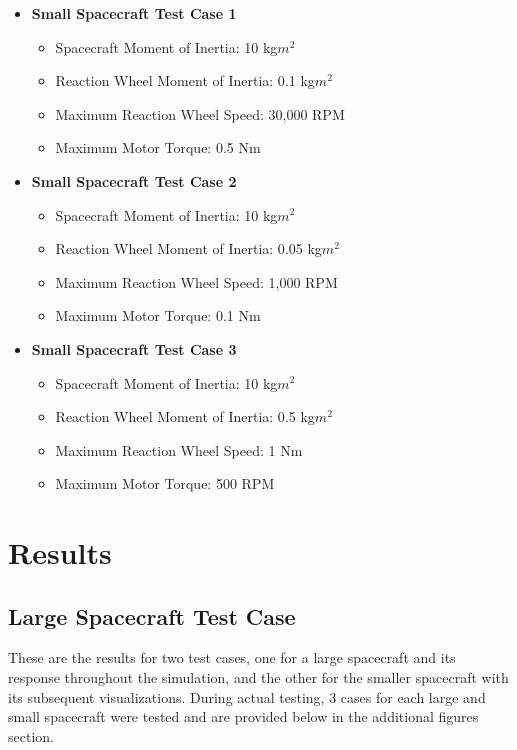 \documentclass{ifacconf}
\begin{document}
\begin{itemize}
    \item \textbf{Small Spacecraft Test Case 1}
        \begin{itemize}
            \item Spacecraft Moment of Inertia: 10 kg$m^2$
            \item Reaction Wheel Moment of Inertia: 0.1 kg$m^2$
            \item Maximum Reaction Wheel Speed: 30,000 RPM
            \item Maximum Motor Torque: 0.5 Nm
        \end{itemize}
        \vspace{0.2cm}
    \item \textbf{Small Spacecraft Test Case 2}
\begin{itemize}
            \item Spacecraft Moment of Inertia: 10 kg$m^2$
            \item Reaction Wheel Moment of Inertia: 0.05 kg$m^2$
            \item Maximum Reaction Wheel Speed: 1,000 RPM
            \item Maximum Motor Torque: 0.1 Nm
        \end{itemize}
        \vspace{0.2cm}
    \item \textbf{Small Spacecraft Test Case 3}
        \begin{itemize}
            \item Spacecraft Moment of Inertia: 10 kg$m^2$
            \item Reaction Wheel Moment of Inertia: 0.5 kg$m^2$ 
            \item Maximum Reaction Wheel Speed: 1 Nm
            \item Maximum Motor Torque: 500 RPM
        \end{itemize}
\end{itemize}

\section{Results}

\subsection{Large Spacecraft Test Case}

These are the results for two test cases, one for a large spacecraft and its response throughout the simulation, and the other for the smaller spacecraft with its subsequent visualizations. During actual testing, 3 cases for each large and small spacecraft were tested and are provided below in the additional figures section. 
\end{document}
